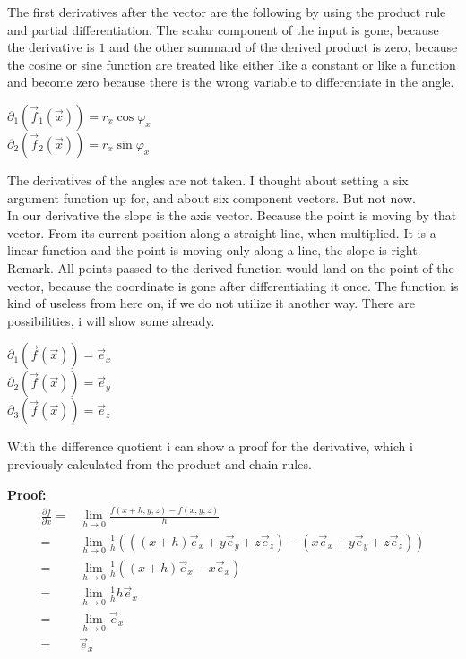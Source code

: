 \documentclass[a4paper]{article}
\begin{document}
The first derivatives after the vector are the following by using the product rule and partial differentiation. 
The scalar component of the input is gone, because the derivative is $1$ and the other summand of the derived product is zero, because the cosine or sine function are treated like either like a constant or like a function and become zero because there is the wrong variable to differentiate in the angle.\\

\begin{center}
$\partial_{1}(\vec{f}_{1}(\vec{x})) = r_{x}\cos\varphi_{x}$\\
$\partial_{2}(\vec{f}_{2}(\vec{x})) = r_{x}\sin\varphi_{x}$\\
\end{center}

The derivatives of the angles are not taken. I thought about setting a six argument function up for, and about six component vectors.
But not now.\\

In our derivative the slope is the axis vector. Because the point is moving by that vector. From its current position along a straight line, when multiplied. It is a linear function and the point is moving only along a line, the slope is right.\\

Remark. All points passed to the derived function would land on the point of the vector, because the coordinate is gone after differentiating it once. The function is kind of useless from here on, if we do not utilize it another way. There are possibilities,
i will show some already.\\

\begin{center}
$\partial_{1}(\vec{f}(\vec{x})) = \vec{e}_{x}$\\
$\partial_{2}(\vec{f}(\vec{x})) = \vec{e}_{y}$\\
$\partial_{3}(\vec{f}(\vec{x})) = \vec{e}_{z}$\\
\end{center}

With the difference quotient i can show a proof for the derivative, which i previously calculated from the product and chain rules.

\textbf{Proof:}\\

\begin{displaymath}
\begin{align}
    \frac{\partial f}{\partial x} =& \lim_{h\rightarrow 0}\frac{f(x+h,y,z)-f(x,y,z)}{h}\\
    =& \lim_{h\rightarrow 0}\frac{1}{h}(((x+h)\vec{e}_x + y\vec{e}_y + z\vec{e}_z) - (x\vec{e}_x + y\vec{e}_y + z\vec{e}_z))\\
    =& \lim_{h\rightarrow 0}\frac{1}{h}((x+h)\vec{e}_x - x\vec{e}_x) \\
    =& \lim_{h\rightarrow 0}\frac{1}{h}h\vec{e}_x\\
    =& \lim_{h\rightarrow 0}\vec{e}_x\\
    =& \vec{e}_x
\end{align}
\end{displaymath}
\end{document}
